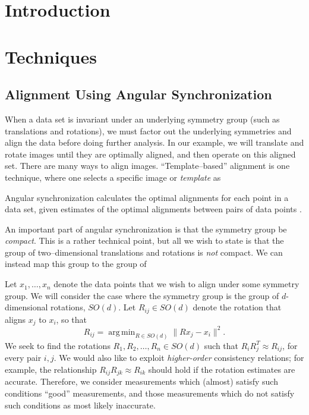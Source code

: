 \documentclass[12pt]{article}
\DeclareMathOperator*{\argmin}{arg\,min}
\begin{document}
\section{Introduction}


\section{Techniques}


\subsection{Alignment Using Angular Synchronization}

When a data set is invariant under an underlying symmetry group (such as translations and rotations), we must factor out the underlying symmetries and align the data before doing further analysis.
%
In our example, we will translate and rotate images until they are optimally aligned, and then operate on this aligned set. 
%
There are many ways to align images. 
%
``Template--based'' alignment \cite{...} is one technique, where one selects a specific image or {\em template} as 

Angular synchronization calculates the optimal alignments for each point in a data set, given estimates of the optimal alignments between pairs of data points \cite{singer2011angular}. 

An important part of angular synchronization is that the symmetry group be {\em compact}. 
%
This is a rather technical point, but all we wish to state is that the group of two--dimensional translations and rotations is {\em not} compact.
%
We can instead map this group to the group of 

Let $x_1, \dots, x_n$ denote the data points that we wish to align under some symmetry group.
%
We will consider the case where the symmetry group is the group of $d$-dimensional rotations, $SO(d)$. 
%
Let $R_{ij} \in SO(d)$ denote the rotation that aligns $x_j$ to $x_i$, so that
\begin{equation}
R_{ij} = \argmin_{R \in SO(d)} \|Rx_j - x_i \|^2.
\end{equation}
%
We seek to find the rotations $R_1, R_2, \dots, R_n \in SO(d)$ such that $R_i R_j^T \approx R_{ij}$, for every pair $i, j$. 
%
We would also like to exploit {\em higher-order} consistency relations;
for example, the relationship $R_{ij} R_{jk} \approx R_{ik}$ should hold if the rotation estimates are accurate.
%
Therefore, we consider measurements which (almost) satisfy such conditions ``good'' measurements, and those measurements which do not satisfy such conditions as most likely inaccurate.
\end{document}
